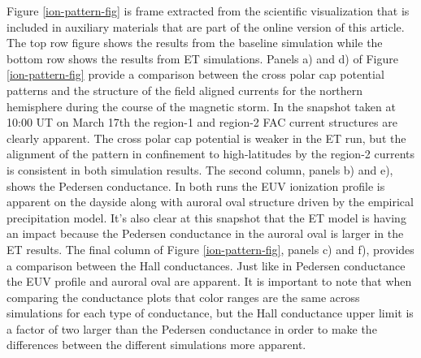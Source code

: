 \documentclass[draft,jgrga]{agutex}
\begin{document}
\begin{article}
Figure \ref{ion-pattern-fig} is frame extracted from the scientific visualization that is included in auxiliary materials that are part of the online version of this article.  The top row figure shows the results from the baseline simulation while the bottom row shows the results from ET simulations.  Panels a) and d) of Figure \ref{ion-pattern-fig} provide a comparison between the cross polar cap potential patterns and the structure of the field aligned currents for the northern hemisphere during the course of the magnetic storm.   In the snapshot taken at 10:00 UT on March 17th the region-1 and region-2 FAC current structures are clearly apparent.  The cross polar cap potential is weaker in the ET run, but the alignment of the pattern in confinement to high-latitudes by the region-2 currents is consistent in both simulation results.  The second column, panels b) and e), shows the Pedersen conductance.  In both runs the EUV ionization  profile is apparent on the dayside along with auroral oval structure driven by the empirical precipitation model.  It's also clear at this snapshot that the ET model is having an impact because the Pedersen conductance in the auroral oval is larger in the ET results.  The final column of Figure \ref{ion-pattern-fig}, panels c) and f), provides a comparison between the Hall conductances.  Just like in Pedersen conductance the EUV profile and auroral oval are apparent.  It is important to note that when comparing the conductance plots that color ranges are the same across simulations for each type of conductance, but the Hall conductance upper limit is a factor of two larger than the Pedersen conductance in order to make the differences between the different simulations more apparent.


\end{article}
\end{document}
